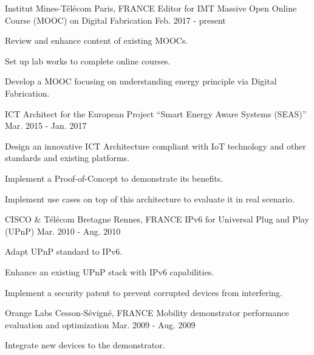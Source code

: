 \begin{cventries}
  \cventry
    {Institut Mines-T\'{e}l\'{e}com}
    {Paris, FRANCE}
    {Editor for IMT Massive Open Online Course (MOOC) on Digital Fabrication }
    {Feb. 2017 - present}
    {
      \begin{cvitems}
        \item {Review and enhance content of existing MOOCs.}
        \item {Set up lab works to complete online courses.}
        \item {Develop a MOOC focusing on understanding energy principle via Digital Fabrication.}
      \end{cvitems}
    }
  \cventry
    { }
    { }
    {\hspace*{0,7cm} ICT Architect for the European Project ``Smart Energy Aware Systems (SEAS)''}
    {Mar. 2015 - Jan. 2017}
    {
      \begin{cvitems}
        \item {Design an innovative ICT Architecture compliant with IoT technology and other standards and existing platforms.}
        \item {Implement a Proof-of-Concept to demonstrate its benefits.}
        \item {Implement use cases on top of this architecture to evaluate it in real scenario.}
      \end{cvitems}
    }
  \cventry
    {CISCO \& T\'{e}l\'{e}com Bretagne}
    {Rennes, FRANCE}
    {IPv6 for Universal Plug and Play (UPnP)}
    {Mar. 2010 - Aug. 2010}
    {
      \begin{cvitems}
        \item {Adapt UPnP standard to IPv6.}
        \item {Enhance an existing UPnP stack with IPv6 capabilities.}
        \item {Implement a security patent to prevent corrupted devices from interfering.}
      \end{cvitems}
    }
  \cventry
    {Orange Labs}
    {Cesson-S\'{e}vign\'{e}, FRANCE}
    {Mobility demonstrator performance evaluation and optimization}
    {Mar. 2009 - Aug. 2009}
    {
      \begin{cvitems}
        \item {Integrate new devices to the demonstrator.}

\end{cvitems}}
\end{cventries}
